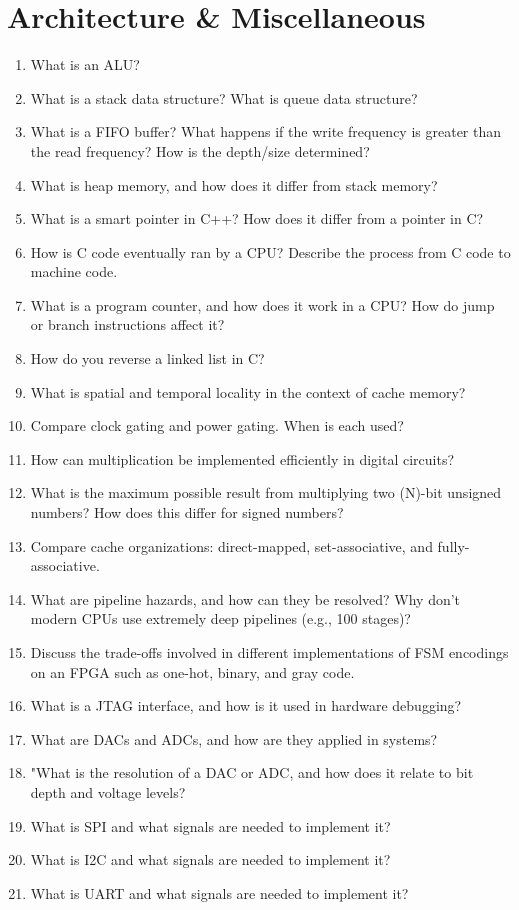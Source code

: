 \documentclass[11pt]{article}
\begin{document}
\section{Architecture \& Miscellaneous}
\begin{enumerate}
    \item What is an ALU?
    \item What is a stack data structure? What is queue data structure?
    \item What is a FIFO buffer? What happens if the write frequency is greater
    than the read frequency? How is the depth/size determined?
    \item What is heap memory, and how does it differ from stack memory?
    \item What is a smart pointer in C++? How does it differ from a pointer in
    C?
    \item How is C code eventually ran by a CPU? Describe the process from C
    code to machine code.
    \item What is a program counter, and how does it work in a CPU? How do jump
    or branch instructions affect it?
    \item How do you reverse a linked list in C?
    \item What is spatial and temporal locality in the context of cache memory?
    \item Compare clock gating and power gating. When is each used?
    \item How can multiplication be implemented efficiently in digital
    circuits?
    \item What is the maximum possible result from multiplying two (N)-bit
    unsigned numbers? How does this differ for signed numbers?
    \item Compare cache organizations: direct-mapped, set-associative, and
    fully-associative.
    \item What are pipeline hazards, and how can they be resolved? Why don't
    modern CPUs use extremely deep pipelines (e.g., 100 stages)?
    \item Discuss the trade-offs involved in different implementations of FSM
    encodings on an FPGA such as one-hot, binary, and gray code.
    \item What is a JTAG interface, and how is it used in hardware debugging?
    \item What are DACs and ADCs, and how are they applied in systems?
    \item "What is the resolution of a DAC or ADC, and how does it relate to
    bit depth and voltage levels?
    \item What is SPI and what signals are needed to implement it?
    \item What is I2C and what signals are needed to implement it?
    \item What is UART and what signals are needed to implement it?
\end{enumerate}
\end{document}
